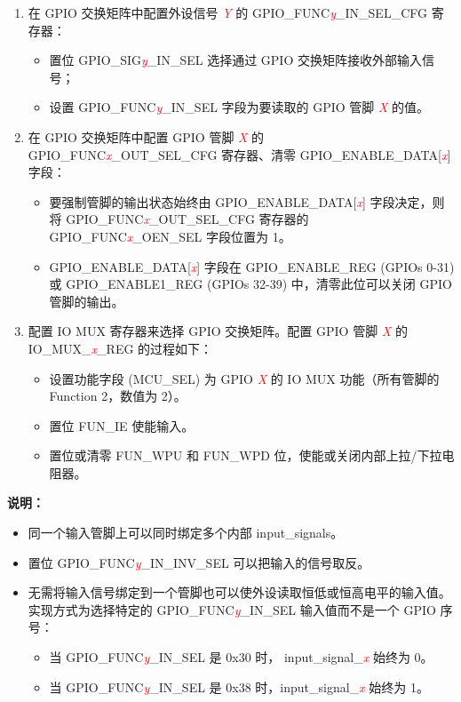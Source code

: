 \documentclass[main\_\_CN.tex]{subfiles}
\begin{document}
\begin{enumerate}
    \item 在 GPIO 交换矩阵中配置外设信号 \textcolor{red}{\it{Y}} 的 GPIO\_FUNC\textcolor{red}{\it{y}}\_IN\_SEL\_CFG 寄存器：
    \begin{itemize}
        \item 置位 GPIO\_SIG\textcolor{red}{\it{y}}\_IN\_SEL 选择通过 GPIO 交换矩阵接收外部输入信号；
        \item 设置 GPIO\_FUNC\textcolor{red}{\it{y}}\_IN\_SEL 字段为要读取的 GPIO 管脚 \textcolor{red}{\it{X}} 的值。
    \end{itemize}
    \item 在 GPIO 交换矩阵中配置 GPIO 管脚 \textcolor{red}{\it{X}} 的 GPIO\_FUNC\textcolor{red}{\it{x}}\_OUT\_SEL\_CFG 寄存器、清零 GPIO\_ENABLE\_DATA[\textcolor{red}{\it{x}}] 字段：
    \begin{itemize}
        \item 要强制管脚的输出状态始终由 GPIO\_ENABLE\_DATA[\textcolor{red}{\it{x}}] 字段决定，则将 GPIO\_FUNC\textcolor{red}{\it{x}}\_OUT\_SEL\_CFG 寄存器的  GPIO\_FUNC\textcolor{red}{\it{x}}\_OEN\_SEL 字段位置为 1。
        \item GPIO\_ENABLE\_DATA[\textcolor{red}{\it{x}}] 字段在 GPIO\_ENABLE\_REG (GPIOs 0-31) 或 GPIO\_ENABLE1\_REG (GPIOs 32-39) 中，清零此位可以关闭 GPIO 管脚的输出。
    \end{itemize}
    \item 配置 IO MUX 寄存器来选择 GPIO 交换矩阵。配置 GPIO 管脚 \textcolor{red}{\it{X}} 的 IO\_MUX\_\textcolor{red}{\it{x}}\_REG 的过程如下：
    \begin{itemize}
        \item 设置功能字段 (MCU\_SEL) 为 GPIO \textcolor{red}{\it{X}} 的 IO MUX 功能（所有管脚的 Function 2，数值为 2）。
        \item 置位 FUN\_IE 使能输入。
        \item 置位或清零 FUN\_WPU 和 FUN\_WPD 位，使能或关闭内部上拉/下拉电阻器。
    \end{itemize}
\end{enumerate}

{\bfseries 说明：}
\begin{itemize}
\item 同一个输入管脚上可以同时绑定多个内部 input\_signals。
\item 置位 GPIO\_FUNC\textcolor{red}{\it{y}}\_IN\_INV\_SEL 可以把输入的信号取反。
\item 无需将输入信号绑定到一个管脚也可以使外设读取恒低或恒高电平的输入值。实现方式为选择特定的 GPIO\_FUNC\textcolor{red}{\it{y}}\_IN\_SEL 输入值而不是一个 GPIO 序号：
\begin {itemize}
\item 当 GPIO\_FUNC\textcolor{red}{\it{y}}\_IN\_SEL 是 0x30 时， input\_signal\_\textcolor{red}{\it{x}} 始终为 0。
\item 当 GPIO\_FUNC\textcolor{red}{\it{y}}\_IN\_SEL 是 0x38 时，input\_signal\_\textcolor{red}{\it{x}} 始终为 1。
\end {itemize}
\end{itemize}
\end{document}
